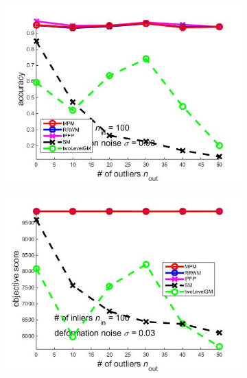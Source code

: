 \documentclass[
	fontsize=12pt,
	paper=a4,
	twoside=false,
	numbers=noenddot,
	plainheadsepline,
	toc=listof,
	toc=bibliography
]{scrartcl}
\begin{document}
\begin{figure}[h] 
	\begin{subfigure}[b]{0.3\textwidth}
		\centering
		\includegraphics[scale=0.25]{"fig_ver2108/syntheticPointSets/outliertest_n50/accuracy_avg10tests"} 
	\end{subfigure}%
	\begin{subfigure}[b]{0.3\textwidth}
		\centering
		\includegraphics[scale=0.25]{"fig_ver2108/syntheticPointSets/outliertest_n50/score_avg10tests"} 
	\end{subfigure} 
	\begin{subfigure}[b]{0.3\textwidth}
		\centering

\end{subfigure}
\end{figure}
\end{document}
